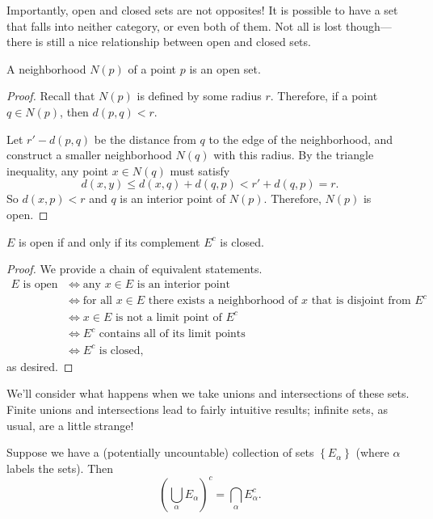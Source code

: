 \documentclass[../m131main.tex]{subfiles}
\begin{document}
Importantly, open and closed sets are not opposites!
It is possible to have a set that falls into neither category, or even both of them.
Not all is lost though---there is still a nice relationship between open and closed sets.

\begin{lemma}
    A neighborhood $N(p)$ of a point $p$ is an open set.
\end{lemma}

\begin{proof}
    Recall that $N(p)$ is defined by some radius $r$.
    Therefore, if a point $q \in N(p)$, then $d(p,q) < r$.

    Let $r' - d(p,q)$ be the distance from $q$ to the edge of the neighborhood, and construct a smaller neighborhood $N(q)$ with this radius.
    By the triangle inequality, any point $x \in N(q)$ must satisfy
    \[ d(x,y) \leq d(x,q) + d(q,p) < r' + d(q,p) = r. \]
    So $d(x,p) < r$ and $q$ is an interior point of $N(p)$.
    Therefore, $N(p)$ is open.
\end{proof}

\begin{theorem}
    $E$ is open if and only if its complement $E^c$ is closed.
\end{theorem}

\begin{proof}
    We provide a chain of equivalent statements.
    \begin{align*}
        \text{$E$ is open} &\iff \text{any $x \in E$ is an interior point} \\
        &\iff \text{for all $x \in E$ there exists a neighborhood of $x$ that is disjoint from $E^c$} \\
        &\iff \text{$x \in E$ is not a limit point of $E^c$} \\
        &\iff \text{$E^c$ contains all of its limit points} \\
        &\iff \text{$E^c$ is closed},
    \end{align*}
    as desired.
\end{proof}

We'll consider what happens when we take unions and intersections of these sets.
Finite unions and intersections lead to fairly intuitive results; infinite sets, as usual, are a little strange!

\begin{lemma}
    Suppose we have a (potentially uncountable) collection of sets $\left\{ E_\alpha \right\}$ (where $\alpha$ labels the sets).
    Then
    \vspace{-2pt}
    \[ \left( \bigcup_\alpha E_\alpha \right)^c = \bigcap_\alpha E_\alpha^c. \]
\end{lemma}
\end{document}
